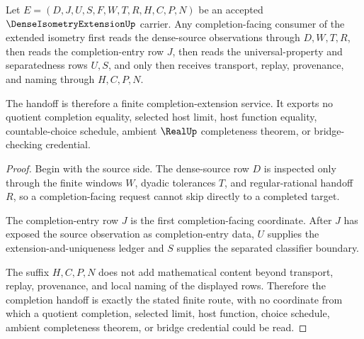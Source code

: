 \begin{theorem}
\label{thm:dense-isometry-extension-completion-handoff}
Let $E=(D,J,U,S,F,W,T,R,H,C,P,N)$ be an accepted $\DenseIsometryExtensionUp$ carrier. Any completion-facing consumer of the extended isometry first reads the dense-source observations through $D,W,T,R$, then reads the completion-entry row $J$, then reads the universal-property and separatedness rows $U,S$, and only then receives transport, replay, provenance, and naming through $H,C,P,N$.

The handoff is therefore a finite completion-extension service. It exports no quotient completion equality, selected host limit, host function equality, countable-choice schedule, ambient $\RealUp$ completeness theorem, or bridge-checking credential.
\end{theorem}
\begin{proof}
Begin with the source side. The dense-source row $D$ is inspected only through the finite windows $W$, dyadic tolerances $T$, and regular-rational handoff $R$, so a completion-facing request cannot skip directly to a completed target.

The completion-entry row $J$ is the first completion-facing coordinate. After $J$ has exposed the source observation as completion-entry data, $U$ supplies the extension-and-uniqueness ledger and $S$ supplies the separated classifier boundary.

The suffix $H,C,P,N$ does not add mathematical content beyond transport, replay, provenance, and local naming of the displayed rows. Therefore the completion handoff is exactly the stated finite route, with no coordinate from which a quotient completion, selected limit, host function, choice schedule, ambient completeness theorem, or bridge credential could be read.
\end{proof}



